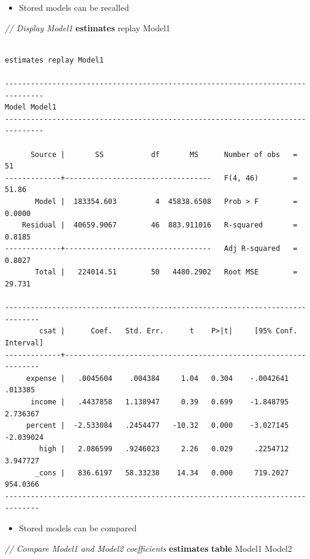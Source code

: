\documentclass[]{book}
\newenvironment{Shaded}{\begin{snugshade}}{\end{snugshade}}
\newcommand{\CommentTok}[1]{\textcolor[rgb]{0.56,0.35,0.01}{\textit{#1}}}
\newcommand{\FunctionTok}[1]{\textcolor[rgb]{0.00,0.00,0.00}{#1}}
\newcommand{\KeywordTok}[1]{\textcolor[rgb]{0.13,0.29,0.53}{\textbf{#1}}}
\newcommand{\NormalTok}[1]{#1}
\providecommand{\tightlist}{%
  \setlength{\itemsep}{0pt}\setlength{\parskip}{0pt}}
\begin{document}
\begin{itemize}
\tightlist
\item
  Stored models can be recalled
\end{itemize}

\begin{Shaded}
\begin{Highlighting}[]
  \CommentTok{// Display Model1}
  \KeywordTok{estimates} \FunctionTok{replay}\NormalTok{ Model1}
\end{Highlighting}
\end{Shaded}

\begin{verbatim}

estimates replay Model1

-------------------------------------------------------------------------------
Model Model1
-------------------------------------------------------------------------------

      Source |       SS           df       MS      Number of obs   =        51
-------------+----------------------------------   F(4, 46)        =     51.86
       Model |  183354.603         4  45838.6508   Prob > F        =    0.0000
    Residual |  40659.9067        46  883.911016   R-squared       =    0.8185
-------------+----------------------------------   Adj R-squared   =    0.8027
       Total |   224014.51        50   4480.2902   Root MSE        =    29.731

------------------------------------------------------------------------------
        csat |      Coef.   Std. Err.      t    P>|t|     [95% Conf. Interval]
-------------+----------------------------------------------------------------
     expense |   .0045604    .004384     1.04   0.304    -.0042641     .013385
      income |   .4437858   1.138947     0.39   0.699    -1.848795    2.736367
     percent |  -2.533084   .2454477   -10.32   0.000    -3.027145   -2.039024
        high |   2.086599   .9246023     2.26   0.029     .2254712    3.947727
       _cons |   836.6197   58.33238    14.34   0.000     719.2027    954.0366
------------------------------------------------------------------------------
\end{verbatim}

\begin{itemize}
\tightlist
\item
  Stored models can be compared
\end{itemize}

\begin{Shaded}
\begin{Highlighting}[]
  \CommentTok{// Compare Model1 and Model2 coefficients}
  \KeywordTok{estimates} \KeywordTok{table}\NormalTok{ Model1 Model2}
\end{Highlighting}
\end{Shaded}
\end{document}
